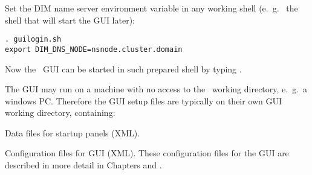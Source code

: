 \item Set the DIM name server environment variable in any working shell (e.~g.~
the shell that will start the GUI later):
\begin{small}
\begin{verbatim}
. guilogin.sh
export DIM_DNS_NODE=nsnode.cluster.domain
\end{verbatim} 
\end{small}

\item Now the \mbs\ GUI can be started in such prepared shell by typing 
.

\enum

\medskip

The GUI may run on a machine with no access to the \mbs\ working directory,
e.~g.\ a windows PC.
Therefore the GUI setup files are typically on their own GUI 
working directory, containing: 
\bbul
\item Data files for startup panels (XML).
\item Configuration files for GUI (XML).
\ebul
These configuration files for the GUI are described in more detail 
in Chapters  and .


